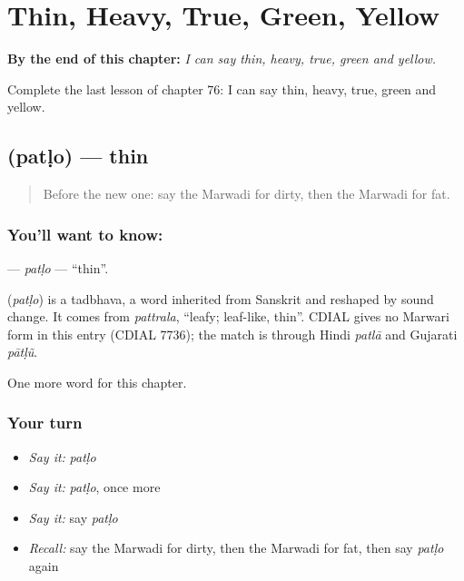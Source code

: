 
\chapter{Thin, Heavy, True, Green, Yellow}
\label{ch:mw-thin-heavy-true-green-yellow}

\begin{chapteropening}
\textbf{By the end of this chapter:} \emph{I can say thin, heavy, true, green and yellow.}

Complete the last lesson of chapter 76: I can say thin, heavy, true, green and yellow.
\end{chapteropening}

\section[\texorpdfstring{\mw{पतळो} (patḷo)}{पतळो (patḷo)}]{ (patḷo) — thin}

\label{lesson:MW-C76-patlo}



\begin{quote}
Before the new one: say the Marwadi for dirty, then the Marwadi for fat.
\end{quote}

\subsection*{You'll want to know: }
\textbf{} — \emph{patḷo} — \textquotedblleft{}thin\textquotedblright{}.

\begin{cousinweb}
\textbf{} (\emph{patḷo}) is a tadbhava, a word inherited from Sanskrit and reshaped by sound change. It comes from \emph{pattrala}, \textquotedblleft{}leafy; leaf-like, thin\textquotedblright{}. CDIAL gives no Marwari form in this entry (CDIAL 7736); the match is through Hindi \emph{patlā} and Gujarati \emph{pātḷũ}.
\end{cousinweb}

\begin{grammarlens}[title={What you've built}]
One more word for this chapter.
\end{grammarlens}

\subsection*{Your turn}
\begin{itemize}
\raggedright
  \item \emph{Say it:} \emph{patḷo}
  \item \emph{Say it:} \emph{patḷo}, once more
  \item \emph{Say it:} say \emph{patḷo}
  \item \emph{Recall:} say the Marwadi for dirty, then the Marwadi for fat, then say \emph{patḷo} again
\end{itemize}

